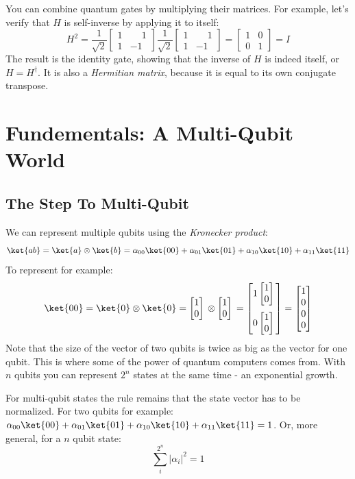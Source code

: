 \documentclass[11pt]{article}
\newcommand{\igate}{
  \begin{bmatrix}
  1 & 0 \\
  0 & 1 
  \end{bmatrix}
}
\newcommand{\hgate}{
  \dfrac{1}{\sqrt2}
  \begin{bmatrix}
  1 & \phantom{-}1 \\
  1 & -1
  \end{bmatrix}
}
\newcommand{\qstatezero}{
  \begin{bmatrix}1 \\ 0\end{bmatrix}
}
\begin{document}
You can combine quantum gates by multiplying their matrices. For example, let's verify that $H$ is self-inverse by applying it to itself:
\[
  H^2 = \hgate{} \hgate{} = \igate{} = I
\]
The result is the identity gate, showing that the inverse of $H$ is indeed itself, or $H = H^\dagger$. It is also a \emph{Hermitian matrix}, because it is equal to its own conjugate transpose.

\newpage

\section{Fundementals: A Multi-Qubit World}
\subsection{The Step To Multi-Qubit}
We can represent multiple qubits using the \emph{Kronecker product}:
\[
  \ket{ab} = \ket{a} \otimes \ket{b} = \alpha_{00}\ket{00} + \alpha_{01}\ket{01} + \alpha_{10}\ket{10} + \alpha_{11}\ket{11}
\]
To represent  for example:
\[
  \ket{00} = \ket{0} \otimes \ket{0} = \qstatezero{} \otimes \qstatezero{} = 
  \begin{bmatrix}
  1\qstatezero{} \\[13pt]
  0\qstatezero{}
  \end{bmatrix}
  =
  \begin{bmatrix}
  1 \\
  0 \\
  0 \\
  0
  \end{bmatrix}
\]
Note that the size of the vector of two qubits is twice as big as the vector for one qubit. This is where some of the power of quantum computers comes from. With $n$ qubits you can represent $2^n$ states at the same time - an exponential growth.

For multi-qubit states the rule remains that the state vector has to be normalized. For two qubits for example: $\alpha_{00}\ket{00} + \alpha_{01}\ket{01} + \alpha_{10}\ket{10} + \alpha_{11}\ket{11} = 1$. Or, more general, for a $n$ qubit state:
\[
\sum_{i}^{2^n} |\alpha_i|^2 = 1
\]
\end{document}
